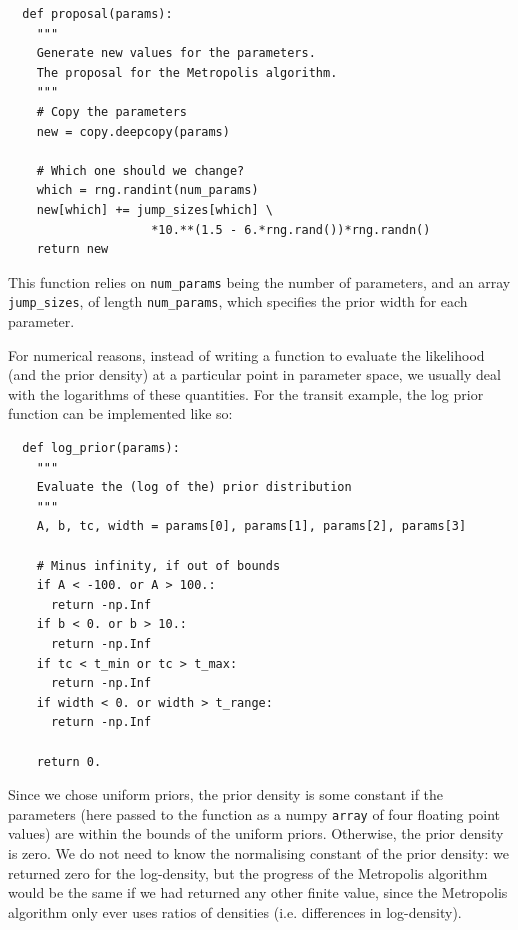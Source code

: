 \begin{verbatim}
  def proposal(params):
    """
    Generate new values for the parameters.
    The proposal for the Metropolis algorithm.
    """
    # Copy the parameters
    new = copy.deepcopy(params)

    # Which one should we change?
    which = rng.randint(num_params)
    new[which] += jump_sizes[which] \
                    *10.**(1.5 - 6.*rng.rand())*rng.randn()
    return new
\end{verbatim}
This function relies on {\tt num\_params} being the number of parameters,
and an array {\tt jump\_sizes}, of length {\tt num\_params}, which specifies
the prior width for each parameter.

For numerical reasons, instead of writing a function to evaluate the likelihood
(and the prior density) at a particular point in parameter space, we usually
deal with the logarithms of these quantities. For the transit example, the
log prior function can be implemented like so:

\begin{verbatim}
  def log_prior(params):
    """
    Evaluate the (log of the) prior distribution
    """
    A, b, tc, width = params[0], params[1], params[2], params[3]

    # Minus infinity, if out of bounds
    if A < -100. or A > 100.:
      return -np.Inf
    if b < 0. or b > 10.:
      return -np.Inf
    if tc < t_min or tc > t_max:
      return -np.Inf
    if width < 0. or width > t_range:
      return -np.Inf

    return 0.
\end{verbatim}

Since we chose uniform priors, the prior density is some constant if the
parameters (here passed to the function as a numpy {\tt array} of four
floating point values) are within the bounds of the uniform priors. Otherwise,
the prior density is zero. We do not need to know the normalising constant
of the prior density: we returned zero for the log-density, but the progress
of the Metropolis algorithm would be the same if we had returned any other
finite value, since the Metropolis algorithm only ever uses ratios of densities
(i.e. differences in log-density).

